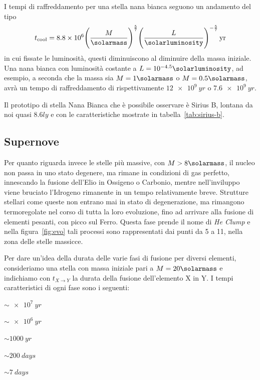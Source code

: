 I tempi di raffreddamento per una stella nana bianca seguono un andamento del tipo
\begin{equation}
    t_\textup{cool} = 8.8 \times 10^6 {\Biggl(\dfrac{M}{\si{\solarmass}} \Biggr)}^{\frac{5}{7}} {\Biggl( \dfrac{L}{\si{\solarluminosity}} \Biggr)}^{-\frac{5}{7}} \, \si{yr}
\end{equation}
in cui fissate le luminosità, questi diminuiscono al diminuire della massa iniziale. Una nana bianca con luminosità costante a $L = 10^{-4.5} \si{\solarluminosity}$, ad esempio, a seconda che la massa sia $M = 1\si{\solarmass}$ o $M = 0.5 \si{\solarmass}$, avrà un tempo di raffreddamento di rispettivamente $\SI{12e9}{yr}$ o $\SI{7.6e9}{yr}$.

Il prototipo di stella Nana Bianca che è possibile osservare è Sirius B, lontana da noi quasi $8.6 \si{ly}$ e con le caratteristiche mostrate in tabella~\ref{tab:sirius-b}.

\subsection{Supernove}\label{sec:supernove}
Per quanto riguarda invece le stelle più massive, con $M > 8 \si{\solarmass}$, il nucleo non passa in uno stato degenere, ma rimane in condizioni di gas perfetto, innescando la fusione dell'Elio in Ossigeno o Carbonio, mentre nell'inviluppo viene bruciato l'Idrogeno rimanente in un tempo relativamente breve. Strutture stellari come queste non entrano mai in stato di degenerazione, ma rimangono termoregolate nel corso di tutta la loro evoluzione, fino ad arrivare alla fusione di elementi pesanti, con picco sul Ferro. Questa fase prende il nome di \emph{He Clump} e nella figura~\ref{fig:evo} tali processi sono rappresentati dai punti da 5 a 11, nella zona delle stelle massicce.

Per dare un'idea della durata delle varie fasi di fusione per diversi elementi, consideriamo una stella con massa iniziale pari a $M = 20\si{\solarmass}$ e indichiamo con $t_{X \rightarrow Y}$ la durata della fusione dell'elemento X in Y. I tempi caratteristici di ogni fase sono i seguenti:
\begin{description}
    \centering
    \item[$t_{H \rightarrow He}$] $\sim \SI{e7}{yr}$
    \item[$t_{He \rightarrow C}$] $\sim \SI{e6}{yr}$
    \item[$t_{C \rightarrow O}$] $\sim \SI{1000}{yr}$
    \item[$t_\textup{O}$] $\sim \SI{200}{days}$
    \item[$t_\textup{Si}$] $\sim \SI{7}{days}$
\end{description}

